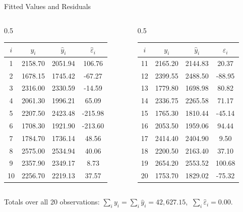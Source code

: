 \begin{frame}{Fitted Values and Residuals}
	\begin{center}
		\begin{columns}[T]
			\begin{column}{0.5\textwidth}
				\centering\small
				\begin{tabular}{cccc}
					\toprule
					$i$ & $y_i$ & $\hat y_i$ & $\hat\varepsilon_i$ \\
					\midrule
					1  & 2158.70 & 2051.94 & 106.76 \\
					2  & 1678.15 & 1745.42 & -67.27 \\
					3  & 2316.00 & 2330.59 & -14.59 \\
					4  & 2061.30 & 1996.21 & 65.09 \\
					5  & 2207.50 & 2423.48 & -215.98 \\
					6  & 1708.30 & 1921.90 & -213.60 \\
					7  & 1784.70 & 1736.14 & 48.56 \\
					8  & 2575.00 & 2534.94 & 40.06 \\
					9  & 2357.90 & 2349.17 & 8.73 \\
					10 & 2256.70 & 2219.13 & 37.57 \\
					\bottomrule
				\end{tabular}
			\end{column}
			\begin{column}{0.5\textwidth}
				\centering\small
				\begin{tabular}{cccc}
					\toprule
					$i$ & $y_i$ & $\hat y_i$ & $\hat\varepsilon_i$ \\
					\midrule
					11 & 2165.20 & 2144.83 & 20.37 \\
					12 & 2399.55 & 2488.50 & -88.95 \\
					13 & 1779.80 & 1698.98 & 80.82 \\
					14 & 2336.75 & 2265.58 & 71.17 \\
					15 & 1765.30 & 1810.44 & -45.14 \\
					16 & 2053.50 & 1959.06 & 94.44 \\
					17 & 2414.40 & 2404.90 & 9.50 \\
					18 & 2200.50 & 2163.40 & 37.10 \\
					19 & 2654.20 & 2553.52 & 100.68 \\
					20 & 1753.70 & 1829.02 & -75.32 \\
					\bottomrule
				\end{tabular}
			\end{column}
		\end{columns}
	\end{center}
	\svspace{0.5em}
	\centering
	Totals over all 20 observations: $\sum_i y_i = \sum_i \hat y_i = 42{,}627.15$, $\ \sum_i \hat\varepsilon_i = 0.00$.
\end{frame}


